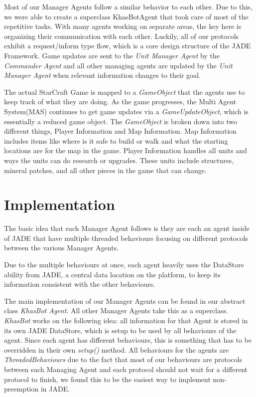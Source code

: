 \documentclass[letterpaper]{article}
\begin{document}
Most of our Manager Agents follow a similar behavior to each other. Due to this, we were able to create a superclass KhasBotAgent that took care of most of the repetitive tasks.  With many agents working on separate areas, the key here is organizing their communication with each other.  Luckily, all of our protocols exhibit a request/inform type flow, which is a core design structure of the JADE Framework.  Game updates are sent to the \emph{Unit Manager Agent} by the \emph{Commander Agent} and all other managing agents are updated by the \emph{Unit Manager Agent} when relevant information changes to their goal.

The actual StarCraft Game is mapped to a \emph{GameObject} that the agents use to keep track of what they are doing.  As the game progresses, the Multi Agent System(MAS) continues to get game updates via a \emph{GameUpdateObject}, which is essentially a reduced game object.  The \emph{GameObject} is broken down into two different things, Player Information and Map Information. Map Information includes items like where is it safe to build or walk and what the starting locations are for the map in the game.  Player Information handles all units and ways the units can do research or upgrades.  These units include structures, mineral patches, and all other pieces in the game that can change.

\section{Implementation}
The basic idea that each Manager Agent follows is they are each an agent inside of JADE that have multiple threaded behaviours focusing on different protocols between the various Manager Agents.

Due to the multiple behaviours at once, each agent heavily uses the DataStore ability from JADE, a central data location on the platform, to keep its information consistent with the other behaviours.

The main implementation of our Manager Agents can be found in our abstract class \emph{KhasBot Agent}. All other Manager Agents take this as a superclass. \emph{KhasBot} works on the following idea: all information for that Agent is stored in its own JADE DataStore, which is setup to be used by all behaviours of the agent. Since each agent has different behaviours, this is something that has to be overridden in their own \emph{setup()} method. All behaviours for the agents are \emph{ThreadedBehaviours} due to the fact that most of our behaviours are protocols between each Managing Agent and each protocol should not wait for a different protocol to finish, we found this to be the easiest way to implement non-preemption in JADE.
\end{document}
